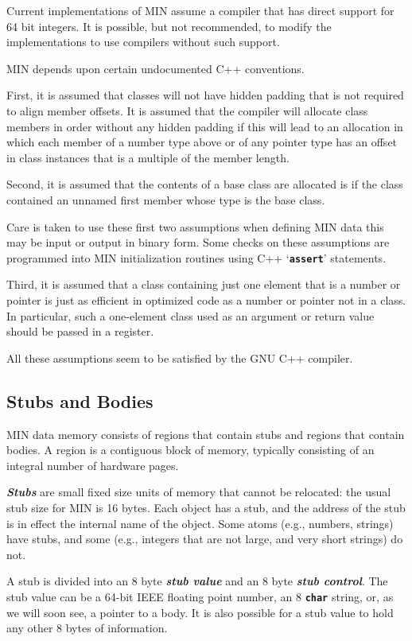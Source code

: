 \documentclass[12pt]{article}
\newcommand{\TT}[1]{{\tt \bfseries #1}}
\newcommand{\key}[1]{{\bf \em #1}\index{#1}}
\newcommand{\ikey}[2]{{\bf \em #1}\index{#2}}
\begin{document}
Current implementations of MIN assume a compiler that has
direct support for 64 bit integers.  It is possible, but not recommended,
to modify the implementations to use compilers without such support.

MIN depends upon certain undocumented C++ conventions.

First, it is assumed that classes will not have hidden
padding that is not required to align member offsets.
It is assumed that the compiler will allocate class members
in order without any hidden padding if this will lead to
an allocation in which each member of a number type above or
of any pointer type has an offset in class instances
that is a multiple of the member length.

Second, it is assumed that the contents of a base class are
allocated is if the class contained an unnamed first member
whose type is the base class.

Care is taken to use these first two assumptions when defining
MIN data this may be input or output in binary form.
Some checks on these assumptions are programmed into MIN
initialization routines using C++ `\TT{assert}' statements.

Third, it is assumed that a class containing just one element
that is a number or pointer is just as efficient in optimized
code as a number or pointer not in a class.  In particular,
such a one-element class used as an argument or return value
should be passed in a register.

All these assumptions seem to be satisfied by the GNU C++
compiler.

\subsection{Stubs and Bodies}

MIN data memory consists of regions that contain stubs and regions
that contain bodies.  A region is a contiguous block
of memory, typically consisting of an integral number of hardware
pages.

\ikey{Stubs}{stub}
are small fixed size units of memory that cannot be relocated:
the usual stub size for MIN is 16 bytes.
Each object has a stub, and the address of the stub is in effect
the internal name of the object.  Some atoms (e.g., numbers, strings)
have stubs, and some (e.g., integers that are not large, and very short
strings) do not.

A stub is divided into an 8 byte \key{stub value}
and an 8 byte \key{stub control}.
The stub value can be a 64-bit IEEE floating point number,
an 8 \TT{char} string, or, as we will soon see, a pointer to a body.
It is also possible for a stub value to hold any other 8 bytes of information.
\end{document}
